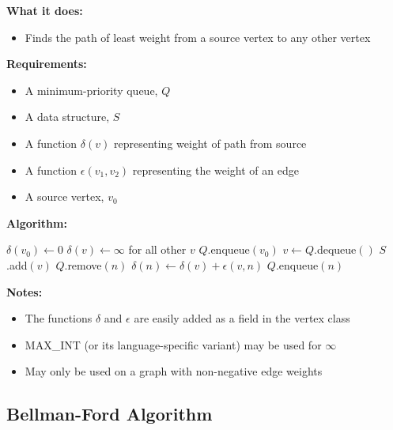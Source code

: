 \textbf{What it does:}
\begin{itemize}
    \item Finds the path of least weight from a source vertex to any other vertex
\end{itemize}
\textbf{Requirements:}
\begin{itemize}
    \item A minimum-priority queue, $Q$
    \item A data structure, $S$
    \item A function $\delta(v)$ representing weight of path from source
    \item A function $\epsilon(v_1, v_2)$ representing the weight of an edge
    \item A source vertex, $v_0$
\end{itemize}
\textbf{Algorithm:}
\begin{algorithmic}[1]
    \STATE $\delta(v_0) \gets 0$
    \STATE $\delta(v) \gets \infty$ for all other $v$
    \STATE $Q$.enqueue$(v_0)$
        \STATE $v \gets Q$.dequeue$()$
        \STATE $S$.add$(v)$
                \STATE $Q$.remove$(n)$
                \STATE $\delta(n) \gets \delta(v) + \epsilon(v, n)$
                \STATE $Q$.enqueue$(n)$
            \ENDIF
        \ENDFOR
    \ENDWHILE
\end{algorithmic}
\textbf{Notes:}
\begin{itemize}
    \item The functions $\delta$ and $\epsilon$ are easily added as a field in the vertex class
    \item MAX\_INT (or its language-specific variant) may be used for $\infty$
    \item May only be used on a graph with non-negative edge weights
\end{itemize}

\subsection{Bellman-Ford Algorithm}

